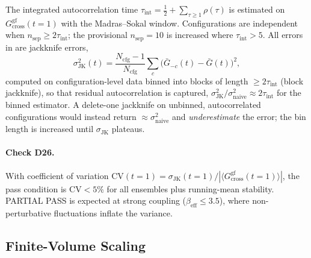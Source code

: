 \documentclass[11pt,a4paper]{article}
\theoremstyle{plain}
\theoremstyle{definition}
\theoremstyle{remark}
\newcommand{\Gcrossgf}{G_{\mathrm{cross}}^{\mathrm{gf}}}
\newcommand{\be}{\beta_{\mathrm{eff}}}
\newcommand{\Ncfg}{N_{\mathrm{cfg}}}
\begin{document}
The integrated autocorrelation time
$\tau_{\mathrm{int}}=\tfrac12+\sum_{\tau\ge1}\rho(\tau)$ is estimated on
$\Gcrossgf(t=1)$ with the Madras--Sokal window. Configurations are
independent when $n_{\mathrm{sep}}\ge2\tau_{\mathrm{int}}$; the
provisional $n_{\mathrm{sep}}=10$ is increased where
$\tau_{\mathrm{int}}>5$. All errors in 
are jackknife errors,
\begin{equation}
  \sigma^2_{\mathrm{JK}}(t)=\frac{\Ncfg-1}{\Ncfg}
  \sum_c\bigl(\bar G_{-c}(t)-\bar G(t)\bigr)^2,
  \label{eq:jackknife}
\end{equation}
computed on configuration-level data binned into blocks of length
$\ge2\tau_{\mathrm{int}}$ (block jackknife), so that residual
autocorrelation is captured, $\sigma^2_{\mathrm{JK}}/\sigma^2_{\mathrm{naive}}
\approx2\tau_{\mathrm{int}}$ for the binned estimator. A delete-one
jackknife on unbinned, autocorrelated configurations would instead return
$\approx\sigma^2_{\mathrm{naive}}$ and \emph{underestimate} the error; the
bin length is increased until $\sigma_{\mathrm{JK}}$ plateaus.

\paragraph{Check D26.}
With coefficient of variation
$\mathrm{CV}(t{=}1)=\sigma_{\mathrm{JK}}(t{=}1)/|\langle\Gcrossgf(t{=}1)\rangle|$,
the pass condition is $\mathrm{CV}<5\%$ for all ensembles plus
running-mean stability. PARTIAL PASS is expected at strong coupling
($\be\le3.5$), where non-perturbative fluctuations inflate the variance.

\subsection{Finite-Volume Scaling}
\label{ssec:FV}
\end{document}

